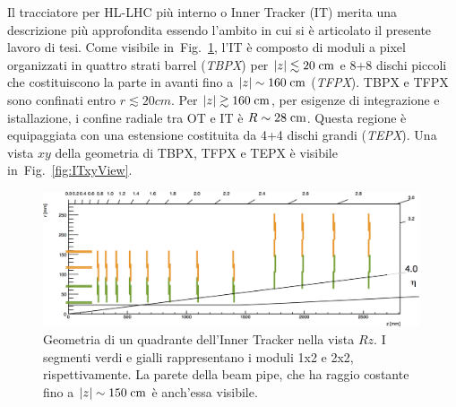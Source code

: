 Il tracciatore per HL-LHC pi\`u interno o Inner Tracker (IT) merita una descrizione pi\`u approfondita essendo l'ambito in cui si \`e articolato il presente lavoro di tesi. Come visibile in~Fig.~\ref{fig:ITRzView}, l'IT \`e composto di moduli a pixel organizzati in quattro strati barrel ({\em TBPX}) per $|z|\lesssim20\rm \; cm$ e 8+8 dischi piccoli che costituiscono la parte in avanti fino a $|z|\sim160\rm \; cm$ ({\em TFPX}). TBPX e TFPX sono confinati entro $r\lesssim20cm$. Per $|z|\gtrsim160\rm \; cm$, per esigenze di integrazione e istallazione, i confine radiale tra OT e IT \`e $R\sim28\rm \; cm$. Questa regione \`e equipaggiata con una estensione costituita da 4+4 dischi grandi ({\em TEPX}). Una vista $xy$ della geometria di TBPX, TFPX e TEPX \`e visibile in~Fig.~\ref{fig:ITxyView}. 
\begin{figure}
\centering
\includegraphics[width=0.99\textwidth]{Immagini/ITRzLayout.png}
\caption{Geometria di un quadrante dell'Inner Tracker nella vista $Rz$. I segmenti verdi e gialli rappresentano i moduli 1x2 e 2x2, rispettivamente. La parete della beam pipe, che ha raggio costante fino a $|z|\sim 150\rm \; cm$ \`e anch'essa visibile.}
\label{fig:ITRzView}
\end{figure}
%
